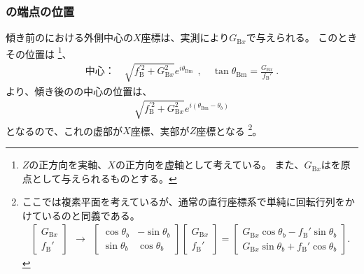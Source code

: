 \subsubsection{\BottomCurvedOutcut の端点の位置}
傾き前の\BottomEndFace における外側中心の$X$座標は、実測により$G_{\mathrm Bx}$で与えられる。
このときその位置は
\footnote{$Z$の正方向を実軸、$X$の正方向を虚軸として考えている。
また、$G_{\mathrm Bx}$は\TableCenter を原点として与えられるものとする。}、
\begin{align*}
  \text{中心：}\quad
  \sqrt{f_\mathrm B^{'2}+G_{\mathrm Bx}^2}e^{i\theta_\mathrm{Bm}}~~, \quad
  \tan\theta_\mathrm{Bm}= \frac{G_{\mathrm Bx}}{f_\mathrm B'}\ .
\end{align*}
より、傾き後の\nameBottomEndFace の中心の位置は、
\begin{align*}
  \sqrt{f_\mathrm B^{'2}+G_{\mathrm Bx}^2}e^{i(\theta_\mathrm{Bm}-\theta_b)}
\end{align*}
となるので、これの虚部が$X$座標、実部が$Z$座標となる
\footnote{ここでは複素平面を考えているが、通常の直行座標系で単純に回転行列をかけているのと同義である。
\begin{align*}
  \left[
    \begin{array}{c}
      G_{\mathrm Bx}\\
      f_\mathrm B'
    \end{array}
  \right]
  ~~\longrightarrow~~
  \left[
    \begin{array}{cc}
      \cos\theta_b & -\sin\theta_b\\
      \sin\theta_b & \cos\theta_b
    \end{array}
  \right]\!\!
  \left[
    \begin{array}{c}
      G_{\mathrm Bx}\\
      f_\mathrm B'
    \end{array}
  \right]
  = \left[
    \begin{array}{c}
      G_{\mathrm Bx}\cos\theta_b-f_\mathrm B'\sin\theta_b\\
      G_{\mathrm Bx}\sin\theta_b+f_\mathrm B'\cos\theta_b
    \end{array}
  \right].
\end{align*}%
}。
